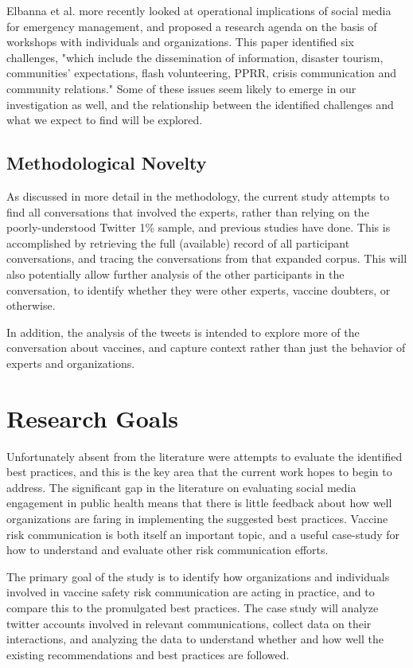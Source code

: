 \documentclass{article}
\begin{document}
Elbanna et al. more recently looked at operational implications of social media for emergency management, and proposed a research agenda on the basis of workshops with individuals and organizations. This paper identified six challenges, "which include the dissemination of information, disaster tourism, communities’ expectations, flash volunteering, PPRR, crisis communication and community relations." \cite{Elbanna2019} Some of these issues seem likely to emerge in our investigation as well, and the relationship between the identified challenges and what we expect to find will be explored.

\subsection{Methodological Novelty}
As discussed in more detail in the methodology, the current study attempts to find all conversations that involved the experts, rather than relying on the poorly-understood Twitter 1\% sample, and previous studies have done. This is accomplished by retrieving the full (available) record of all participant conversations, and tracing the conversations from that expanded corpus. This will also potentially allow further analysis of the other participants in the conversation, to identify whether they were other experts, vaccine doubters, or otherwise.

In addition, the analysis of the tweets is intended to explore more of the conversation about vaccines, and capture context rather than just the behavior of experts and organizations.

\section{Research Goals}

Unfortunately absent from the literature were attempts to evaluate the identified best practices, and this is the key area that the current work hopes to begin to address. The significant gap in the literature on evaluating social media engagement in public health means that there is little feedback about how well organizations are faring in implementing the suggested best practices. Vaccine risk communication is both itself an important topic, and a useful case-study for how to understand and evaluate other risk communication efforts.

The primary goal of the study is to identify how organizations and individuals involved in vaccine safety risk communication are acting in practice, and to compare this to the promulgated best practices. The case study will analyze twitter accounts involved in relevant communications, collect data on their interactions, and analyzing the data to understand whether and how well the existing recommendations and best practices are followed. 
\end{document}
